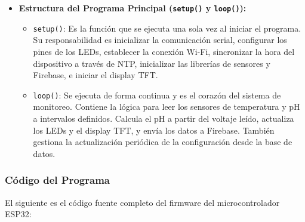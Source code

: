 \documentclass[a4paper,12pt]{article}
\begin{document}
\begin{itemize}
		\item \textbf{Estructura del Programa Principal (\texttt{setup()} y \texttt{loop()}):}
		\begin{itemize}
			\item \texttt{setup()}: Es la función que se ejecuta una sola vez al iniciar el programa. Su responsabilidad es inicializar la comunicación serial, configurar los pines de los LEDs, establecer la conexión Wi-Fi, sincronizar la hora del dispositivo a través de NTP, inicializar las librerías de sensores y Firebase, e iniciar el display TFT.
			\item \texttt{loop()}: Se ejecuta de forma continua y es el corazón del sistema de monitoreo. Contiene la lógica para leer los sensores de temperatura y pH a intervalos definidos. Calcula el pH a partir del voltaje leído, actualiza los LEDs y el display TFT, y envía los datos a Firebase. También gestiona la actualización periódica de la configuración desde la base de datos.
		\end{itemize}
	\end{itemize}
	
	\subsubsection{Código del Programa}
	El siguiente es el código fuente completo del firmware del microcontrolador ESP32:
	
\end{document}
